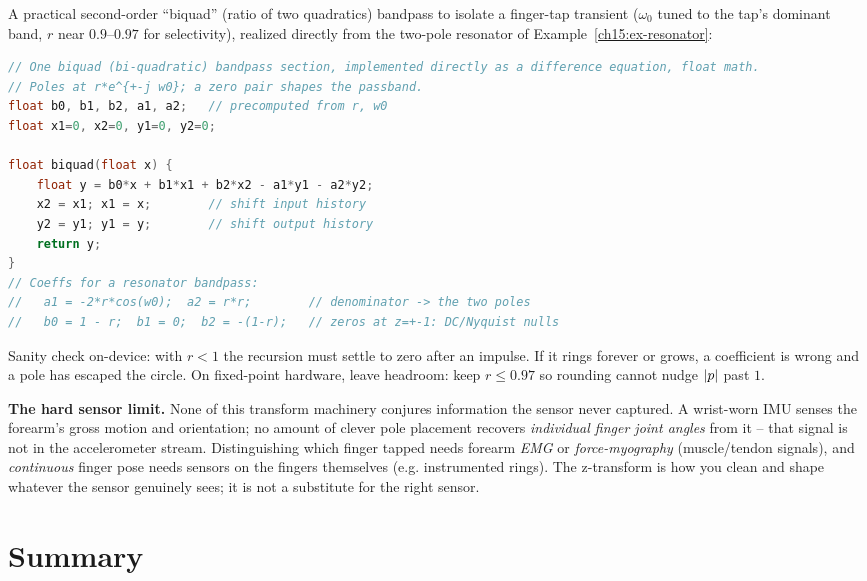 \begin{buildbox}
A practical second-order ``biquad'' (ratio of two quadratics) bandpass to isolate a finger-tap transient
($\omega_0$ tuned to the tap's dominant band, $r$ near $0.9$--$0.97$ for selectivity),
realized directly from the two-pole resonator of Example~\ref{ch15:ex-resonator}:
\begin{lstlisting}[language=C]
// One biquad (bi-quadratic) bandpass section, implemented directly as a difference equation, float math.
// Poles at r*e^{+-j w0}; a zero pair shapes the passband.
float b0, b1, b2, a1, a2;   // precomputed from r, w0
float x1=0, x2=0, y1=0, y2=0;

float biquad(float x) {
    float y = b0*x + b1*x1 + b2*x2 - a1*y1 - a2*y2;
    x2 = x1; x1 = x;        // shift input history
    y2 = y1; y1 = y;        // shift output history
    return y;
}
// Coeffs for a resonator bandpass:
//   a1 = -2*r*cos(w0);  a2 = r*r;        // denominator -> the two poles
//   b0 = 1 - r;  b1 = 0;  b2 = -(1-r);   // zeros at z=+-1: DC/Nyquist nulls
\end{lstlisting}
Sanity check on-device: with $r<1$ the recursion must settle to zero after an impulse. If
it rings forever or grows, a coefficient is wrong and a pole has escaped the circle. On
fixed-point hardware, leave headroom: keep $r \le 0.97$ so rounding cannot nudge
$\lvert p\rvert$ past $1$.
\end{buildbox}

\begin{trapbox}
\textbf{The hard sensor limit.} None of this transform machinery conjures information the
sensor never captured. A wrist-worn IMU senses the forearm's gross motion and orientation;
no amount of clever pole placement recovers \emph{individual finger joint angles} from it
-- that signal is not in the accelerometer stream. Distinguishing which finger
tapped needs forearm \emph{EMG} or \emph{force-myography} (muscle/tendon signals), and
\emph{continuous} finger pose needs sensors on the fingers themselves (e.g. instrumented
rings). The z-transform is how you clean and shape whatever the sensor genuinely sees; it
is not a substitute for the right sensor.
\end{trapbox}

\section{Summary}
\label{ch15:summary}

